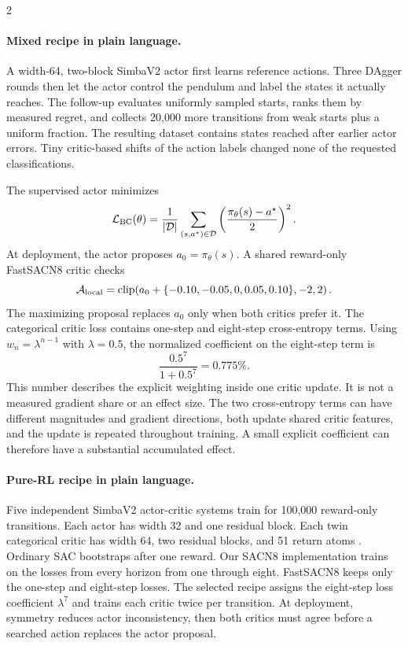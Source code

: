 \vspace{1mm}
\begin{multicols}{2}
\paragraph{Mixed recipe in plain language.}
A width-64, two-block SimbaV2 actor first learns reference actions. Three DAgger rounds then let the actor control the pendulum and label the states it actually reaches. The follow-up evaluates uniformly sampled starts, ranks them by measured regret, and collects 20,000 more transitions from weak starts plus a uniform fraction. The resulting dataset contains states reached after earlier actor errors. Tiny critic-based shifts of the action labels changed none of the requested classifications.

The supervised actor minimizes
\[
\mathcal L_{\rm BC}(\theta)=
\frac{1}{|\mathcal D|}\sum_{(s,a^\star)\in\mathcal D}
\left(\frac{\pi_\theta(s)-a^\star}{2}\right)^2.
\]
At deployment, the actor proposes $a_0=\pi_\theta(s)$. A shared reward-only FastSACN8 critic checks
\[
\mathcal A_{\rm local}=
\operatorname{clip}\!\left(a_0+\{-0.10,-0.05,0,0.05,0.10\},-2,2\right).
\]
The maximizing proposal replaces $a_0$ only when both critics prefer it. The categorical critic loss contains one-step and eight-step cross-entropy terms. Using $w_n=\lambda^{n-1}$ with $\lambda=0.5$, the normalized coefficient on the eight-step term is
\[
\frac{0.5^7}{1+0.5^7}=0.775\%.
\]
This number describes the explicit weighting inside one critic update. It is not a measured gradient share or an effect size. The two cross-entropy terms can have different magnitudes and gradient directions, both update shared critic features, and the update is repeated throughout training. A small explicit coefficient can therefore have a substantial accumulated effect.

\paragraph{Pure-RL recipe in plain language.}
Five independent SimbaV2 actor-critic systems train for 100,000 reward-only transitions. Each actor has width 32 and one residual block. Each twin categorical critic has width 64, two residual blocks, and 51 return atoms \cite{bellemare2017distributional}. Ordinary SAC bootstraps after one reward. Our SACN8 implementation trains on the losses from every horizon from one through eight. FastSACN8 keeps only the one-step and eight-step losses. The selected recipe assigns the eight-step loss coefficient $\lambda^7$ and trains each critic twice per transition. At deployment, symmetry reduces actor inconsistency, then both critics must agree before a searched action replaces the actor proposal.


\end{multicols}
